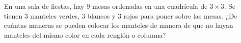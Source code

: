En una sala de fiestas, hay $9$ mesas ordenadas en una cuadrícula de $3\times 3$. Se tienen $3$ manteles verdes, $3$ blancos y $3$ rojos para poner sobre las mesas. ¿De cuántas maneras se pueden colocar los manteles de manera de que no hayan manteles del mismo color en cada renglón o columna?